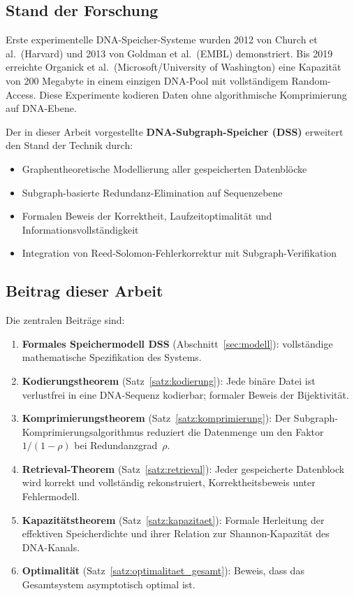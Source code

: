 ﻿\documentclass[a4paper,12pt]{article}
\theoremstyle{definition}
\begin{document}
\subsection{Stand der Forschung}

Erste experimentelle DNA-Speicher-Systeme wurden 2012 von Church et al.\
(Harvard) und 2013 von Goldman et al.\ (EMBL) demonstriert.
Bis 2019 erreichte Organick et al.\ (Microsoft/University of Washington)
eine Kapazit\"{a}t von 200 Megabyte in einem einzigen DNA-Pool mit
vollst\"{a}ndigem Random-Access. Diese Experimente kodieren Daten ohne
algorithmische Komprimierung auf DNA-Ebene.

Der in dieser Arbeit vorgestellte \textbf{DNA-Subgraph-Speicher (DSS)}
erweitert den Stand der Technik durch:
\begin{itemize}
    \item Graphentheoretische Modellierung aller gespeicherten Datenbl\"{o}cke
    \item Subgraph-basierte Redundanz-Elimination auf Sequenzebene
    \item Formalen Beweis der Korrektheit, Laufzeitoptimalit\"{a}t und
          Informationsvollst\"{a}ndigkeit
    \item Integration von Reed-Solomon-Fehlerkorrektur mit Subgraph-Verifikation
\end{itemize}

\subsection{Beitrag dieser Arbeit}

Die zentralen Beitr\"{a}ge sind:

\begin{enumerate}
    \item \textbf{Formales Speichermodell DSS} (Abschnitt~\ref{sec:modell}):
          vollst\"{a}ndige mathematische Spezifikation des Systems.
    \item \textbf{Kodierungstheorem} (Satz~\ref{satz:kodierung}):
          Jede bin\"{a}re Datei ist verlustfrei in eine DNA-Sequenz
          kodierbar; formaler Beweis der Bijektivit\"{a}t.
    \item \textbf{Komprimierungstheorem} (Satz~\ref{satz:komprimierung}):
          Der Subgraph-Komprimierungsalgorithmus reduziert die Datenmenge
          um den Faktor $1/(1-\rho)$ bei Redundanzgrad~$\rho$.
    \item \textbf{Retrieval-Theorem} (Satz~\ref{satz:retrieval}):
          Jeder gespeicherte Datenblock wird korrekt und vollst\"{a}ndig
          rekonstruiert, Korrektheitsbeweis unter Fehlermodell.
    \item \textbf{Kapazit\"{a}tstheorem} (Satz~\ref{satz:kapazitaet}):
          Formale Herleitung der effektiven Speicherdichte und ihrer
          Relation zur Shannon-Kapazit\"{a}t des DNA-Kanals.
    \item \textbf{Optimalit\"{a}t} (Satz~\ref{satz:optimalitaet_gesamt}):
          Beweis, dass das Gesamtsystem asymptotisch optimal ist.
\end{enumerate}
\end{document}
